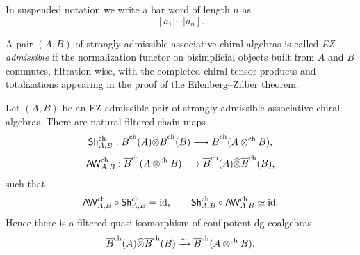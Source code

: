 In suspended notation we write a bar word of length $n$ as
\[
[a_1|\cdots|a_n].
\]

\begin{definition}
A pair $(A,B)$ of strongly admissible associative chiral algebras is called \emph{EZ-admissible} if
the normalization functor on bisimplicial objects built from $A$ and $B$ commutes, filtration-wise,
with the completed chiral tensor products and totalizations appearing in the proof of the
Eilenberg--Zilber theorem.
\end{definition}

\begin{theorem}
\label{thm:shuffle}
Let $(A,B)$ be an EZ-admissible pair of strongly admissible associative chiral algebras.
There are natural filtered chain maps
\[
\mathsf{Sh}^{\mathrm{ch}}_{A,B}:
\overline{B}^{\mathrm{ch}}(A)\widehat\otimes \overline{B}^{\mathrm{ch}}(B)\longrightarrow \overline{B}^{\mathrm{ch}}(A\mathbin{\otimes^{\mathrm{ch}}} B),
\]
\[
\mathsf{AW}^{\mathrm{ch}}_{A,B}:
\overline{B}^{\mathrm{ch}}(A\mathbin{\otimes^{\mathrm{ch}}} B)\longrightarrow \overline{B}^{\mathrm{ch}}(A)\widehat\otimes \overline{B}^{\mathrm{ch}}(B),
\]
such that
\[
\mathsf{AW}^{\mathrm{ch}}_{A,B}\circ \mathsf{Sh}^{\mathrm{ch}}_{A,B}=\mathrm{id},
\qquad
\mathsf{Sh}^{\mathrm{ch}}_{A,B}\circ \mathsf{AW}^{\mathrm{ch}}_{A,B}\simeq \mathrm{id}.
\]
Hence there is a filtered quasi-isomorphism of conilpotent dg coalgebras
\[
\overline{B}^{\mathrm{ch}}(A)\widehat\otimes \overline{B}^{\mathrm{ch}}(B)\xrightarrow{\sim}\overline{B}^{\mathrm{ch}}(A\mathbin{\otimes^{\mathrm{ch}}} B).
\]
\end{theorem}

